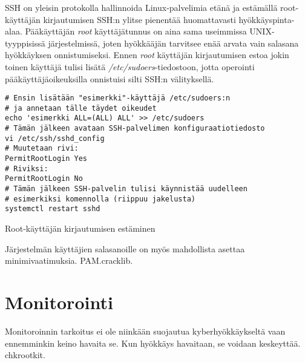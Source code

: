 SSH on yleisin protokolla hallinnoida Linux-palvelimia etänä ja estämällä root-käyttäjän kirjautumisen SSH:n ylitse pienentää huomattavasti hyökkäyspinta-alaa. Pääkäyttäjän \textit{root} käyttäjätunnus on aina sama useimmissa UNIX-tyyppisissä järjestelmissä, joten hyökkääjän tarvitsee enää arvata vain salasana hyökkäyksen onnistumiseksi. Ennen \textit{root} käyttäjän kirjautumisen estoa jokin toinen käyttäjä tulisi lisätä \textit{/etc/sudoers}-tiedostoon, jotta operointi pääkäyttäjäoikeuksilla onnistuisi silti SSH:n välityksellä.~\cite{sshd}~\cite{sudo}

\begin{algorithm}[tbh]
\begin{verbatim}
# Ensin lisätään "esimerkki"-käyttäjä /etc/sudoers:n
# ja annetaan tälle täydet oikeudet
echo 'esimerkki ALL=(ALL) ALL' >> /etc/sudoers
# Tämän jälkeen avataan SSH-palvelimen konfiguraatiotiedosto
vi /etc/ssh/sshd_config
# Muutetaan rivi:
PermitRootLogin Yes
# Riviksi:
PermitRootLogin No
# Tämän jälkeen SSH-palvelin tulisi käynnistää uudelleen
# esimerkiksi komennolla (riippuu jakelusta)
systemctl restart sshd
\end{verbatim}
\caption{Root-käyttäjän kirjautumisen estäminen\label{alg:disable_root_login}}
\end{algorithm}
\newpage{}

Järjestelmän käyttäjien salasanoille on myös mahdollista asettaa minimivaatimuksia. PAM.cracklib.

\section{Monitorointi}\label{monitorointi}
Monitoroinnin tarkoitus ei ole niinkään suojautua kyberhyökkäykseltä vaan ennemminkin keino havaita se. Kun hyökkäys havaitaan, se voidaan keskeyttää. chkrootkit.
